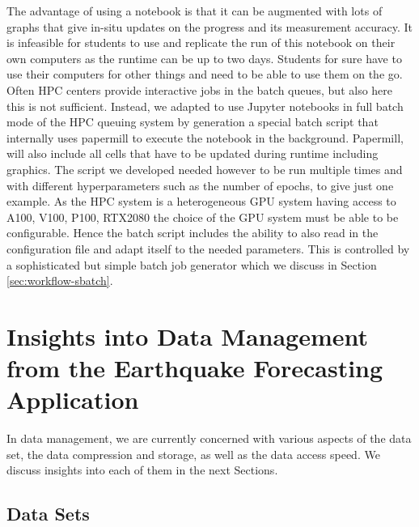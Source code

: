 \documentclass[utf8]{FrontiersinVancouver} %
\begin{document}
The advantage of using a notebook is that it can be augmented with
lots of graphs that give in-situ updates on the progress and its
measurement accuracy. It is infeasible for students to use and
replicate the run of this notebook on their own computers as the
runtime can be up to two days. Students for sure have to use their
computers for other things and need to be able to use them on the
go. Often HPC centers provide interactive jobs in the batch queues,
but also here this is not sufficient. Instead, we adapted to use
Jupyter notebooks in full batch mode of the HPC queuing system by
generation a special batch script that internally uses papermill to
execute the notebook in the background. Papermill, will also include
all cells that have to be updated during runtime including
graphics. The script we developed needed however to be run multiple
times and with different hyperparameters such as the number of epochs,
to give just one example. As the HPC system is a heterogeneous GPU
system having access to A100, V100, P100, RTX2080 the choice of the
GPU system must be able to be configurable. Hence the batch script
includes the ability to also read in the configuration file and adapt
itself to the needed parameters. This is controlled by a sophisticated
but simple batch job generator which we discuss in Section
\ref{sec:workflow-sbatch}.



\section{Insights into Data Management from the Earthquake Forecasting Application}
\label{sec:eq-data}

In data management, we are currently concerned with various aspects of
the data set, the data compression and storage, as well as the data
access speed. We discuss insights into each of them in the next Sections.

\subsection{Data Sets}
\end{document}
